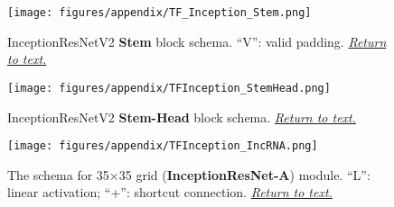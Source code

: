 \begin{multicols}{2}
    
    \begin{minipage}{\columnwidth}
        \begin{figure}[H]
        \begin{center}
        \texttt{[image: figures/appendix/TF\_Inception\_Stem.png]}
        \caption{InceptionResNetV2 \textbf{Stem} block schema. ``V'': valid padding.
        \newline
        \protect\hyperref[fig:Arch_IncRN2]{\textit{Return to text.}}}
        \space\label{fig:IncRN2_Stem}
        \end{center}
        \end{figure}
        \end{minipage}
    
    \begin{minipage}{\columnwidth}
        \begin{figure}[H]
        \begin{center}
        \texttt{[image: figures/appendix/TFInception\_StemHead.png]}
        \caption{InceptionResNetV2 \textbf{Stem-Head} block schema.
        \newline
        \protect\hyperref[fig:Arch_IncRN2]{\textit{Return to text.}}}
        \space\label{fig:IncRN2_StemHead}
        \end{center}
        \end{figure}
        \end{minipage}
        
    \begin{minipage}{\columnwidth}
        \begin{figure}[H]
        \begin{center}
        \texttt{[image: figures/appendix/TFInception\_IncRNA.png]}
        \caption{The schema for 35×35 grid (\textbf{InceptionResNet-A}) module. ``L'': linear activation; ``+'': shortcut connection.
        \newline
        \protect\hyperref[fig:Arch_IncRN2]{\textit{Return to text.}}}
        \space\label{fig:IncRN2_IncA}
        \end{center}
        \end{figure}
        \end{minipage}
    

\end{multicols}
